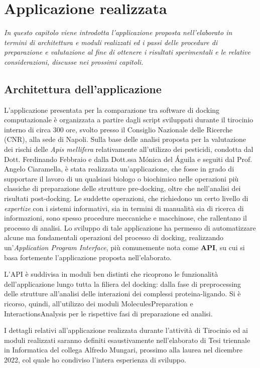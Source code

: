 \chapter{Applicazione realizzata}

\textit{In questo capitolo viene introdotta l'applicazione proposta nell'elaborato in termini di architettura e moduli realizzati ed i passi delle procedure di preparazione e valutazione al fine di ottenere i risultati sperimentali e le relative considerazioni, discusse nei prossimi capitoli. }

\section{Architettura dell'applicazione}
L'applicazione presentata per la comparazione tra software di docking computazionale è organizzata a partire dagli script sviluppati durante il tirocinio interno di circa 300 ore, svolto presso il Consiglio Nazionale delle Ricerche (CNR), alla sede di Napoli.
Sulla base delle analisi proposta per la valutazione dei rischi delle \textit{Apis mellifera} relativamente all'utilizzo dei pesticidi, condotta dal Dott. Ferdinando Febbraio e dalla Dott.ssa Mónica del Águila e seguiti dal Prof. Angelo Ciaramella, è stata realizzata un'applicazione, che fosse in grado di supportare il lavoro di un qualsiasi biologo o biochimico nelle operazioni più classiche di preparazione delle strutture pre-docking, oltre che nell'analisi dei risultati post-docking. Le suddette operazioni, che richiedono un certo livello di \textit{expertize} con i sistemi informativi, sia in termini di manualità sia di ricerca di informazioni, sono spesso procedure meccaniche e macchinose, che rallentano il processo di analisi. Lo sviluppo di tale applicazione ha permesso di automatizzare alcune ma fondamentali operazioni del processo di docking, realizzando un'\textit{Application Program Interface}, più comunemente nota come \textbf{API}, su cui si basa fortemente l'applicazione proposta nell'elaborato. 

L'API è suddivisa in moduli ben distinti che ricoprono le funzionalità dell'applicazione lungo tutta la filiera del docking: dalla fase di preprocessing delle strutture all'analisi delle interazioni dei complessi proteina-ligando. Si è ricorso, quindi, all'utilizzo dei moduli MoleculesPreparation e InteractionsAnalysis per le rispettive fasi di preparazione ed analisi.

I dettagli relativi all'applicazione realizzata durante l'attività di Tirocinio ed ai moduli realizzati saranno definiti esaustivamente nell'elaborato di Tesi triennale in Informatica del collega Alfredo Mungari, prossimo alla laurea nel dicembre 2022, col quale ho condiviso l'intera esperienza di sviluppo.

